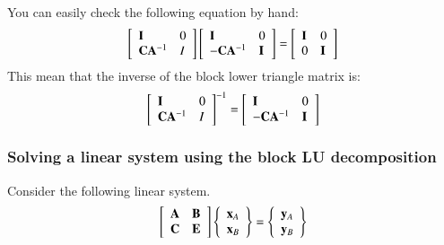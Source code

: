 You can easily check the following equation by hand:
\begin{eqnarray}
\left[\begin{array}{ll}
\mathbf{I} & 0
\\ \mathbf{C}\mathbf{A}^{-1} & I
\end{array}\right]
\left[\begin{array}{ll}
\mathbf{I} & 0\\
-\mathbf{C}\mathbf{A}^{-1} & \mathbf{I}
\end{array}\right]
=
\left[\begin{array}{ll}
\mathbf{I} & 0\\
0 & \mathbf{I}
\end{array}\right]
\end{eqnarray}
%
This mean that the inverse of the block lower triangle matrix is:
%
\begin{eqnarray}
\left[\begin{array}{ll}
\mathbf{I} & 0\\
\mathbf{C}\mathbf{A}^{-1} & I
\end{array}\right]^{-1}
=
\left[\begin{array}{ll}
\mathbf{I} & 0\\
-\mathbf{C}\mathbf{A}^{-1} & \mathbf{I}
\end{array}\right]
\end{eqnarray}




\subsubsection{Solving a linear system using the block LU decomposition}

Consider the following linear system.
%
\begin{eqnarray}
\left[\begin{array}{ll}
\mathbf{A} & \mathbf{B}\\
\mathbf{C} & \mathbf{E}
\end{array}\right]
\left\{\begin{array}{l}
\mathbf{x}_A\\
\mathbf{x}_B
\end{array}\right\}
=
\left\{\begin{array}{l}
\mathbf{y}_A\\
\mathbf{y}_B
\end{array}\right\}
\end{eqnarray}


